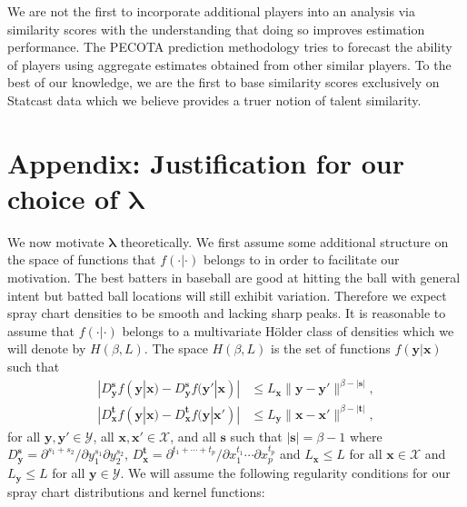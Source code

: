 \documentclass[12pt]{article}
\newcommand{\Y}{\mathcal{Y}}
\newcommand{\X}{\mathcal{X}}
\newcommand{\y}{\textbf{y}}
\newcommand{\x}{\textbf{x}}
\newcommand{\s}{\textbf{s}}
\newcommand{\tbf}{\textbf{t}}
\newcommand{\lambdabf}{\boldsymbol{\lambda}}
\begin{document}
We are not the first to incorporate additional players into an analysis via similarity scores with the understanding that doing so improves estimation performance. The PECOTA prediction methodology \citep{PECOTA} tries to forecast the ability of players using aggregate estimates obtained from other similar players. To the best of our knowledge, we are the first to base similarity scores exclusively on Statcast data which we believe provides a truer notion of talent similarity.  







\section*{Appendix: Justification for our choice of $\lambdabf$}

We now motivate $\lambdabf$ theoretically. We first assume some additional structure on the space of functions that $f(\cdot|\cdot)$ belongs to in order to facilitate our motivation. The best batters in baseball are good at hitting the ball with general intent but batted ball locations will still exhibit variation. Therefore we expect spray chart densities to be smooth and lacking sharp peaks. It is reasonable to assume that $f(\cdot|\cdot)$ belongs to a multivariate H{\"o}lder class of densities which we will denote by $H(\beta,L)$. The space $H(\beta,L)$ is the set of functions $f(\y|\x)$ such that 
\begin{align*}
|D_{\y}^\s f(\y|\x) - D_{\y}^\s f(\y'|\x)| &\leq L_\x\|\y - \y'\|^{\beta - |\s|}, \\
|D_{\x}^\tbf f(\y|\x) - D_{\x}^\tbf f(\y|\x')| &\leq L_\y\|\x - \x'\|^{\beta - |\tbf|}, 
\end{align*}
for all $\y,\y' \in \Y$, all $\x,\x' \in \X$, and all $\s$ such that $|\s| = \beta - 1$ where
$D_{\y}^\s = \partial^{s_1 + s_2}/\partial y_1^{s_1} \partial y_2^{s_2}$, 
$D_{\x}^\tbf = \partial^{t_1 + \cdots + t_p}/\partial x_1^{t_1} \cdots \partial x_p^{t_p}$ and $L_\x \leq L$ for all $\x \in \X$ and $L_\y \leq L$ for all $\y \in \Y$. 
We will assume the following regularity conditions for our spray chart distributions and kernel functions: 
\end{document}

